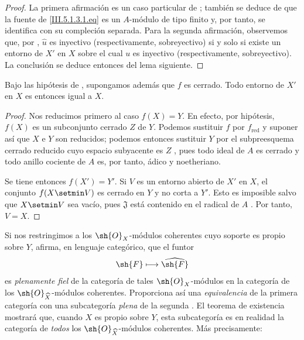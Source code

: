 \documentclass[oneside]{amsart}
\newcommand{\oldpage}[2][]{{\marginnote{\normalfont\textbf{#1}~|~#2}}\ignorespaces}
\let\EGAOriginalLabel\label
\renewcommand{\label}[1]{\phantomsection\EGAOriginalLabel{#1}}
\begin{document}
\begin{proof}
La primera afirmación es un caso particular de ; también
se deduce de que la fuente de \eqref{III.5.1.3.1.eq} es
un $A$-módulo de tipo finito y, por tanto, se identifica con su
compleción separada. Para la segunda afirmación, observemos que, por
, $\widehat{u}$ es inyectivo (respectivamente,
sobreyectivo) si y solo si existe un entorno de $X'$ en
$X$ sobre el cual $u$ es inyectivo (respectivamente, sobreyectivo). La
conclusión se deduce entonces del lema siguiente.
\end{proof}

\oldpage[III]{150}

\begin{lemma}[5.1.3.1]
\label{III.5.1.3.1}
Bajo las hipótesis de , supongamos además que
$f$ es cerrado. Todo entorno de $X'$ en $X$ es entonces igual
a $X$.
\end{lemma}

\begin{proof}
Nos reducimos primero al caso $f(X)=Y$. En efecto, por hipótesis,
$f(X)$ es un subconjunto cerrado $Z$ de $Y$. Podemos sustituir $f$ por
$f_{\mathrm{red}}$  y suponer así que $X$
e $Y$ son reducidos; podemos entonces sustituir $Y$ por el subpreesquema
cerrado reducido cuyo espacio subyacente es $Z$
, pues todo ideal de $A$ es cerrado y todo
anillo cociente de $A$ es, por tanto, ádico y noetheriano.

Se tiene entonces $f(X')=Y'$. Si $V$ es un entorno abierto de $X'$
en $X$, el conjunto $f(X\setmin V)$ es cerrado en $Y$ y no corta a $Y'$.
Esto es imposible salvo que $X\setmin V$ sea vacío, pues $\mathfrak{J}$
está contenido en el radical de $A$
 . Por tanto, $V=X$.
\end{proof}

Si nos restringimos a los $\sh{O}_X$-módulos coherentes cuyo
soporte es propio sobre $Y$,  afirma, en lenguaje
categórico, que el funtor
\[
  \sh{F}\longmapsto\widehat{\sh{F}}
\]
es \emph{plenamente fiel} de la categoría de tales $\sh{O}_X$-módulos en
la categoría de los $\sh{O}_{\widehat{X}}$-módulos coherentes. Proporciona así
una \emph{equivalencia} de la primera categoría con una subcategoría \emph{plena}
de la segunda . El teorema de existencia
mostrará que, cuando $X$ es propio sobre $Y$, esta subcategoría es en
realidad la categoría de \emph{todos} los
$\sh{O}_{\widehat{X}}$-módulos coherentes. Más precisamente:
\end{document}

